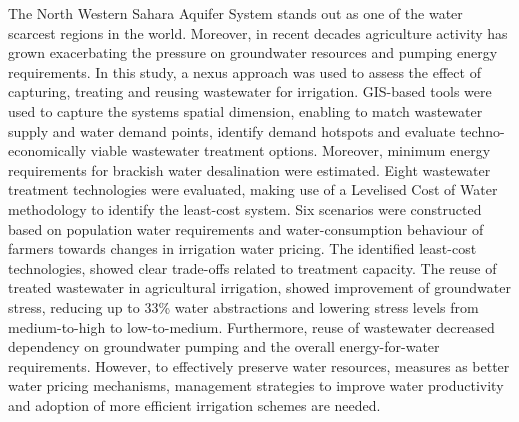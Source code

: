 The North Western Sahara Aquifer System stands out as one of the water scarcest regions in the world. Moreover, in recent decades agriculture activity has grown exacerbating the pressure on groundwater resources and pumping energy requirements. In this study, a nexus approach was used to assess the effect of capturing, treating and reusing wastewater for irrigation. GIS-based tools were used to capture the systems spatial dimension, enabling to match wastewater supply and water demand points, identify demand hotspots and evaluate techno-economically viable wastewater treatment options. Moreover, minimum energy requirements for brackish water desalination were estimated. Eight  wastewater treatment technologies were evaluated, making use of a Levelised Cost of Water methodology to identify the least-cost system. Six scenarios were constructed based on population water requirements and water-consumption behaviour of farmers towards changes in irrigation water pricing. The identified least-cost technologies, showed clear trade-offs related to treatment capacity. The reuse of treated wastewater in agricultural irrigation, showed improvement of groundwater stress, reducing up to 33\% water abstractions and lowering stress levels from medium-to-high to low-to-medium. Furthermore, reuse of wastewater decreased dependency on groundwater pumping and the overall energy-for-water requirements. However, to effectively preserve water resources, measures as better water pricing mechanisms, management strategies to improve water productivity and adoption of more efficient irrigation schemes are needed.
